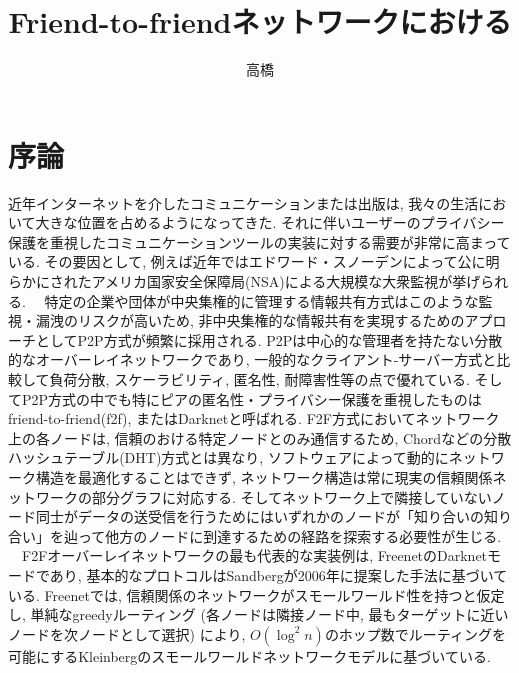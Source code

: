 \documentclass[dvipdfmx]{ampbt}
\title{Friend-to-friendネットワークにおける} %
      {効率的な分散ルーティング}                         %
      {}                                         %
\author{高橋}{彰}             %
\begin{document}
\ifoutputbody
\makeinsidecover                %
\makeabstract                   %
\maketoc                        %
\setcounter{page}{1}            %
\section{序論}
近年インターネットを介したコミュニケーションまたは出版は, 我々の生活において大きな位置を占めるようになってきた. それに伴いユーザーのプライバシー保護を重視したコミュニケーションツールの実装に対する需要が非常に高まっている. その要因として, 例えば近年ではエドワード・スノーデンによって公に明らかにされたアメリカ国家安全保障局(NSA)による大規模な大衆監視が挙げられる. \newline
\ \ 特定の企業や団体が中央集権的に管理する情報共有方式はこのような監視・漏洩のリスクが高いため, 非中央集権的な情報共有を実現するためのアプローチとしてP2P方式が頻繁に採用される. P2Pは中心的な管理者を持たない分散的なオーバーレイネットワークであり, 一般的なクライアント-サーバー方式と比較して負荷分散, スケーラビリティ, 匿名性, 耐障害性等の点で優れている\cite{lua2005survey}. そしてP2P方式の中でも特にピアの匿名性・プライバシー保護を重視したものはfriend-to-friend(\acrshort{f2f})\cite{bricklin2000friend}, またはDarknet\cite{clarke2010private}と呼ばれる. F2F方式においてネットワーク上の各ノードは, 信頼のおける特定ノードとのみ通信するため, Chord\cite{stoica2001chord}などの分散ハッシュテーブル(DHT)方式とは異なり, ソフトウェアによって動的にネットワーク構造を最適化することはできず, ネットワーク構造は常に現実の信頼関係ネットワークの部分グラフに対応する. そしてネットワーク上で隣接していないノード同士がデータの送受信を行うためにはいずれかのノードが「知り合いの知り合い」を辿って他方のノードに到達するための経路を探索する必要性が生じる\cite{roos2016dealing}.\newline
\ \ F2Fオーバーレイネットワークの最も代表的な実装例は, Freenet\cite{clarke2001freenet}のDarknetモード\cite{clarke2010private}であり, 基本的なプロトコルはSandberg\cite{sandberg2006distributed}が2006年に提案した手法に基づいている. Freenetでは, 信頼関係のネットワークがスモールワールド性を持つと仮定し, 単純なgreedyルーティング (各ノードは隣接ノード中, 最もターゲットに近いノードを次ノードとして選択) により, $O(\log^2 n)$のホップ数でルーティングを可能にするKleinbergのスモールワールドネットワークモデル\cite{kleinberg2000small}に基づいている. \newline
\end{document}
